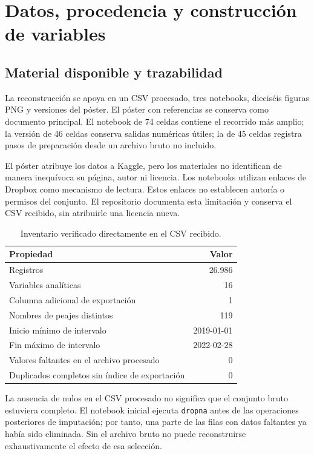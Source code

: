 \documentclass[11pt,a4paper]{article}
\newcommand{\campo}[1]{\nolinkurl{#1}}
\begin{document}
\section{Datos, procedencia y construcción de variables}
\subsection{Material disponible y trazabilidad}
La reconstrucción se apoya en un CSV procesado, tres notebooks, dieciséis figuras PNG y versiones del póster. El póster con referencias se conserva como documento principal. El notebook de 74 celdas contiene el recorrido más amplio; la versión de 46 celdas conserva salidas numéricas útiles; la de 45 celdas registra pasos de preparación desde un archivo bruto no incluido.

El póster atribuye los datos a Kaggle, pero los materiales no identifican de manera inequívoca su página, autor ni licencia. Los notebooks utilizan enlaces de Dropbox como mecanismo de lectura. Estos enlaces no establecen autoría o permisos del conjunto. El repositorio documenta esta limitación y conserva el CSV recibido, sin atribuirle una licencia nueva.

\begin{table}[ht]\centering
\caption{Inventario verificado directamente en el CSV recibido.}
\begin{tabular}{lr}\toprule
Propiedad & Valor\\\midrule
Registros & 26.986\\
Variables analíticas & 16\\
Columna adicional de exportación & 1\\
Nombres de peajes distintos & 119\\
Inicio mínimo de intervalo & 2019-01-01\\
Fin máximo de intervalo & 2022-02-28\\
Valores faltantes en el archivo procesado & 0\\
Duplicados completos sin índice de exportación & 0\\\bottomrule
\end{tabular}\end{table}

La ausencia de nulos en el CSV procesado no significa que el conjunto bruto estuviera completo. El notebook inicial ejecuta \campo{dropna} antes de las operaciones posteriores de imputación; por tanto, una parte de las filas con datos faltantes ya había sido eliminada. Sin el archivo bruto no puede reconstruirse exhaustivamente el efecto de esa selección.
\end{document}
